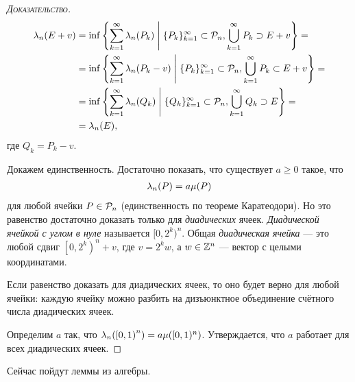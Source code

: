 \begin{proof}[\normalfont\textsc{Доказательство}]
  \begin{align*}
   \lambda_n(E+v) &= \inf \left\{ \sum_{k=1}^{\infty} \lambda_n(P_k) \;\middle|\; \{P_{k}\}_{k=1}^{\infty} \subset \mathcal{P}_n, \bigcup_{k=1}^{\infty} P_k \supset E + v  \right\} = \\
   &= \inf \left\{ \sum_{k=1}^{\infty} \lambda_n(P_k - v) \;\middle|\; \{P_{k}\}_{k=1}^{\infty}  \subset \mathcal{P}_n, \bigcup_{k=1}^{\infty} P_k \subset E+v \right\} = \\
   &= \inf \left\{ \sum_{k=1}^{\infty} \lambda_n(Q_k) \;\middle|\; \{Q_{k}\}_{k=1}^{\infty} \subset \mathcal{P}_n, \bigcup_{k=1}^{\infty} Q_k \supset E   \right\} = \\
   &= \lambda_n(E)
 ,\end{align*} где $Q_k = P_k - v$.

 Докажем единственность. Достаточно показать, что существует $a \geqslant 0$ такое, что \begin{align*}
  \lambda_n(P) = a\mu(P)
 \end{align*} для любой ячейки $P \in \mathcal{P}_n$ (единственность по теореме Каратеодори). Но это равенство достаточно доказать только для \textit{диадических} ячеек. \textit{Диадической ячейкой с углом в нуле} называется $[0, 2^{k})^{n}$. Общая \textit{диадическая ячейка} --- это любой сдвиг $\left[0, 2^{k}\right)^{n} + v$, где $v = 2^{k}w$, а $w \in \mathbb{Z}^{n}$ --- вектор с целыми координатами.

 Если равенство доказать для диадических ячеек, то оно будет верно для любой ячейки: каждую ячейку можно разбить на дизъюнктное объединение счётного числа диадических ячеек. 

 Определим $a$ так, что  $\lambda_n(\left[0, 1\right)^{n}) = a\mu([0, 1)^{n})$. Утверждается, что $a$ работает для всех диадических ячеек.
\end{proof}

Сейчас пойдут леммы из алгебры.

